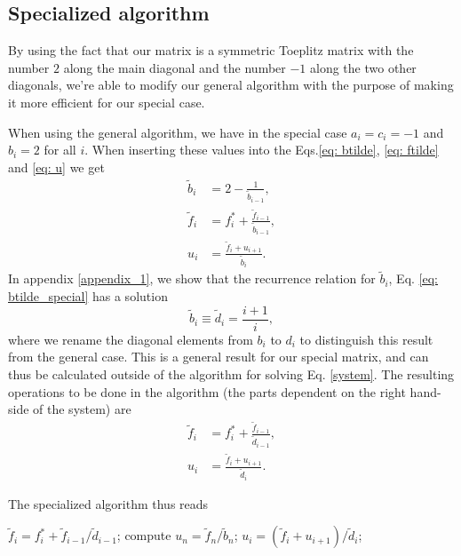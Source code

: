 \documentclass[%
 reprint,
nofootinbib,
 amsmath,amssymb,
 aps,
]{revtex4-1}
\begin{document}
\subsection{Specialized algorithm}

By using the fact that our matrix is a symmetric Toeplitz matrix with the number $2$ along the main diagonal and the number $-1$ along the two other diagonals, we're able to modify our general algorithm with the purpose of making it more efficient for our special case.

When using the general algorithm, we have in the special case $a_i = c_i = -1$ and $b_i = 2$ for all $i$. When inserting these values into the Eqs.\eqref{eq: btilde}, \eqref{eq: ftilde} and \eqref{eq: u} we get
\begin{align}
  \tilde{b}_i &= 2 - \frac{1}{\tilde{b}_{i-1}}, \label{eq: btilde_special} \\
  \tilde{f}_i &= f^{*}_i + \frac{\tilde{f}_{i-1}}{\tilde{b}_{i-1}}, \label{eq: ftilde_special} \\
  u_i &= \frac{\tilde{f}_i + u_{i+1}}{\tilde{b}_i}. \label{eq: u_special}
\end{align}
In appendix \ref{appendix_1}, we show that the recurrence relation for $\tilde{b}_i$, Eq. \eqref{eq: btilde_special} has a solution
\begin{equation}
\tilde{b}_i \equiv \tilde{d}_i = \frac{i+1}{i},
\end{equation}
where we rename the diagonal elements from $b_i$ to $d_i$ to distinguish this result from the general case. This is a general result for our special matrix, and can thus be calculated outside of the algorithm for solving Eq. \eqref{system}. The resulting operations to be done in the algorithm (the parts dependent on the right hand-side of the system) are
 \begin{align}
  \tilde{f}_i &= f^{*}_i + \frac{\tilde{f}_{i-1}}{\tilde{d}_{i-1}}, \label{eq: ftilde_special} \\
  u_i &= \frac{\tilde{f}_i + u_{i+1}}{\tilde{d}_i}. \label{eq: u_special}
\end{align}

The specialized algorithm thus reads
\begin{algorithmic}[H]
\State
{}
	\State $\tilde{f}_i = f^*_i + \tilde{f}_{i-1}/\tilde{d}_{i-1}$;
\EndFor
\State
\State compute $u_{n} = \tilde{f}_n/\tilde{b}_n$;
\State
{}
	\State $u_i = (\tilde{f}_i + u_{i+1})/\tilde{d}_i$;
\EndFor
\State
\end{algorithmic}
\end{document}
